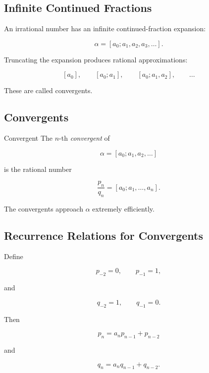 \subsection{Infinite Continued Fractions}
\label{subsec:infinite-continued-fractions}

An irrational number has an infinite continued-fraction expansion:

\[ \alpha=[a_0;a_1,a_2,a_3,\ldots]. \]

Truncating the expansion produces rational approximations:

\[
[a_0],\qquad
[a_0;a_1],\qquad
[a_0;a_1,a_2],\qquad\ldots
\]

These are called convergents.

\subsection{Convergents}
\label{subsec:continued-fraction-convergents}

\begin{definitionbox}{Convergent}
The \(n\)-th \emph{convergent} of

\[ \alpha=[a_0;a_1,a_2,\ldots] \]

is the rational number

\[ \frac{p_n}{q_n}=[a_0;a_1,\ldots,a_n]. \]
\end{definitionbox}

The convergents approach \(\alpha\) extremely efficiently.

\subsection{Recurrence Relations for Convergents}
\label{subsec:convergent-recurrences}

Define

\[
p_{-2}=0,\qquad p_{-1}=1,
\]

and

\[
q_{-2}=1,\qquad q_{-1}=0.
\]

Then

\[ \boxed{p_n=a_np_{n-1}+p_{n-2}} \]

and

\[ \boxed{q_n=a_nq_{n-1}+q_{n-2}}. \]

